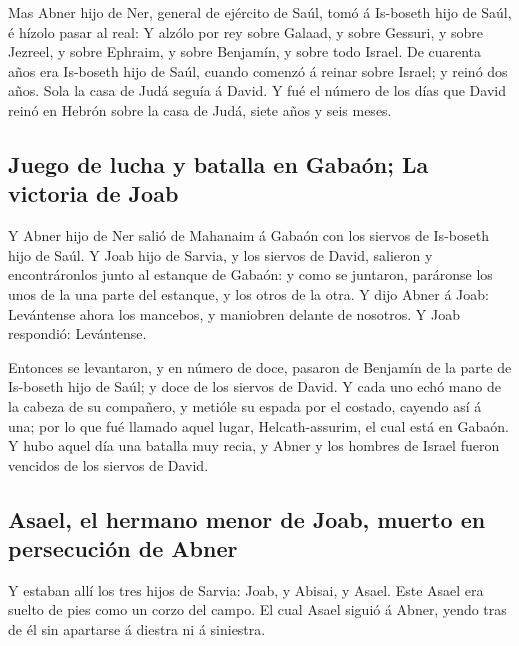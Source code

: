  Mas Abner hijo de Ner, general de ejército de Saúl, tomó á
Is-boseth hijo de Saúl, é hízolo pasar al real:  Y alzólo
por rey sobre Galaad, y sobre Gessuri, y sobre Jezreel, y sobre Ephraim,
y sobre Benjamín, y sobre todo Israel.  De cuarenta años
era Is-boseth hijo de Saúl, cuando comenzó á reinar sobre Israel; y
reinó dos años. Sola la casa de Judá seguía á David.  Y fué
el número de los días que David reinó en Hebrón sobre la casa de Judá,
siete años y seis meses.

\hypertarget{juego-de-lucha-y-batalla-en-gabauxf3n-la-victoria-de-joab}{%
\subsection{Juego de lucha y batalla en Gabaón; La victoria de
Joab}\label{juego-de-lucha-y-batalla-en-gabauxf3n-la-victoria-de-joab}}

 Y Abner hijo de Ner salió de Mahanaim á Gabaón con los
siervos de Is-boseth hijo de Saúl.  Y Joab hijo de Sarvia,
y los siervos de David, salieron y encontráronlos junto al estanque de
Gabaón: y como se juntaron, paráronse los unos de la una parte del
estanque, y los otros de la otra.  Y dijo Abner á Joab:
Levántense ahora los mancebos, y maniobren delante de nosotros. Y Joab
respondió: Levántense.

 Entonces se levantaron, y en número de doce, pasaron de
Benjamín de la parte de Is-boseth hijo de Saúl; y doce de los siervos de
David.  Y cada uno echó mano de la cabeza de su compañero,
y metióle su espada por el costado, cayendo así á una; por lo que fué
llamado aquel lugar, Helcath-assurim, el cual está en Gabaón.
 Y hubo aquel día una batalla muy recia, y Abner y los
hombres de Israel fueron vencidos de los siervos de David.

\hypertarget{asael-el-hermano-menor-de-joab-muerto-en-persecuciuxf3n-de-abner}{%
\subsection{Asael, el hermano menor de Joab, muerto en persecución de
Abner}\label{asael-el-hermano-menor-de-joab-muerto-en-persecuciuxf3n-de-abner}}

 Y estaban allí los tres hijos de Sarvia: Joab, y Abisai, y
Asael. Este Asael era suelto de pies como un corzo del campo.
 El cual Asael siguió á Abner, yendo tras de él sin
apartarse á diestra ni á siniestra.

